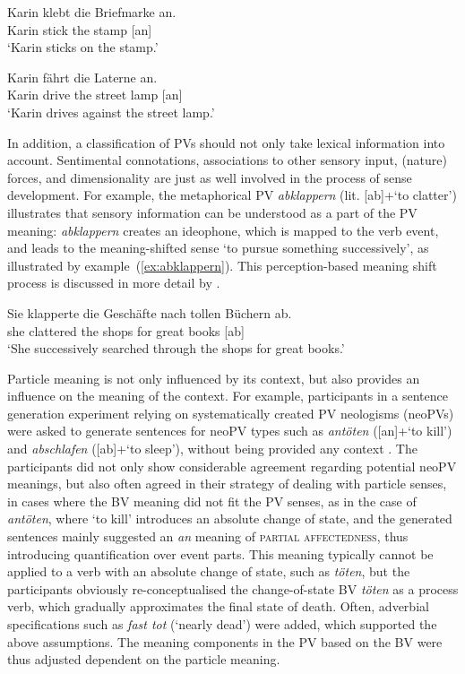\documentclass[output=paper]{langsci/langscibook}
\begin{document}
\ea\label{ex:ankleben}
\gll Karin klebt die Briefmarke an.\\
Karin stick the stamp [an]\\
\glt `Karin sticks on the stamp.'
\z

\ea\label{ex:anfahrenLaterne1}
\gll Karin fährt die Laterne an.\\
Karin drive the {street lamp} [an]\\
\glt `Karin drives against the street lamp.'
\z

In addition, a classification of PVs should not only take lexical
information into account. Sentimental connotations, associations to
other sensory input, (nature) forces, and dimensionality are just as
well involved in the process of sense development. For example, the
metaphorical PV \textit{abklappern} (lit. [ab]+`to clatter')
illustrates that sensory information can be understood as a part of
the PV meaning: \textit{abklappern} creates an ideophone, which is
mapped to the verb event, and leads to the meaning-shifted sense `to
pursue something successively', as illustrated by
example~(\ref{ex:abklappern}). This perception-based meaning shift
process is discussed in more detail by \cite{SpringorumEtAl:13}.

\ea\label{ex:abklappern}
\gll Sie klapperte die Geschäfte nach tollen Büchern ab.\\
she clattered the shops for great books [ab]\\
\glt `She successively searched through the shops for great books.'
\z

Particle meaning is not only influenced by its context, but also
provides an influence on the meaning of the context. For example,
participants in a sentence generation experiment relying on
systematically created PV neologisms (neoPVs) were asked to generate
sentences for neoPV types such as \textit{antöten} ([an]+`to kill')
and \textit{abschlafen} ([ab]+`to sleep'), without being provided any
context \citep{SpringorumEtAl:13c}. The participants did not only
show considerable agreement regarding potential neoPV meanings, but
also often agreed in their strategy of dealing with particle senses,
in cases where the BV meaning did not fit the PV senses, as in the
case of \textit{antöten}, where `to kill' introduces an absolute
change of state, and the generated sentences mainly suggested an
\textit{an} meaning of \textsc{partial affectedness}, thus introducing
quantification over event parts. This meaning typically cannot be
applied to a verb with an absolute change of state, such as
\textit{töten}, but the participants obviously re-conceptualised the
change-of-state BV \textit{töten} as a process verb, which gradually
approximates the final state of death. Often, adverbial specifications
such as \textit{fast tot} (`nearly dead') were added, which supported
the above assumptions. The meaning components in the PV based on the
BV were thus adjusted dependent on the particle meaning.
\end{document}
